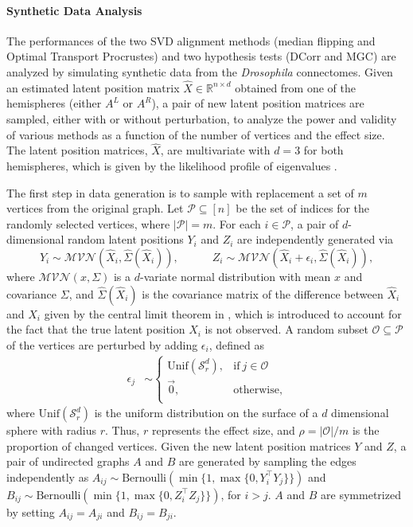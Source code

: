 \paragraph{Synthetic Data Analysis}
The performances of the two SVD alignment methods (median flipping and Optimal Transport Procrustes) and two hypothesis tests (DCorr and MGC) are analyzed by simulating synthetic data from the \textit{Drosophila} connectomes. Given an estimated latent position matrix $\hat X\in \mathbb{R}^{n\times d}$ obtained from one of the hemispheres (either $A^L$ or $A^R$), a pair of new latent position matrices are sampled, either with or without perturbation, to analyze the power and validity of various methods as a function of the number of vertices and the effect size. The latent position matrices, $\hat X$, are multivariate with $d=3$ for both hemispheres, which is given by the likelihood profile of eigenvalues \cite{zhu2006automatic}.

The first step in data generation is to sample with replacement a set of $m$ vertices from the original graph. Let $\mathcal{P}\subseteq [n]$ be the set of indices for the randomly selected vertices, where $|\mathcal{P}|=m$. For each $i\in\mathcal{P}$, a pair of $d$-dimensional random latent positions $Y_i$ and $Z_i$ are independently generated
via 
\[Y_i \sim \mathcal{MVN}(\hat X_i, \hat\Sigma(\hat X_i)), \quad\quad \quad Z_i \sim  \mathcal{MVN}(\hat X_i + \epsilon_i, \hat\Sigma(\hat X_i)),\]
where $\mathcal{MVN}(x, \Sigma)$  is a $d$-variate normal distribution with mean $x$ and covariance $\Sigma$, and $\hat\Sigma(\hat X_i)$ is the covariance matrix of the difference between $\hat{X}_i$ and  $X_i$ given by the central limit theorem in \cite{Athreya2015}, which is introduced to account for the fact that the true latent position $X_i$ is not observed. A random subset $\mathcal{O} \subseteq \mathcal{P}$ of the vertices are perturbed by adding $\epsilon_i$,  defined as 
\begin{align*}
\epsilon_j &\sim 
\begin{cases}
     \text{Unif}(\mathcal{S}^d_r), & \text{if}~j \in \mathcal{O}\\
    \vec 0, & \text{otherwise},\\
\end{cases}
\end{align*}
where $\text{Unif}(\mathcal{S}^d_r)$ is the uniform distribution on the surface of a $d$ dimensional sphere with radius $r$. Thus, $r$ represents the effect size, and $\rho = |\mathcal{O}| / m$ is the proportion of changed vertices. Given the new latent position matrices $Y$ and $Z$, a pair of undirected graphs $A$ and $B$ are generated by sampling the edges independently as $A_{ij}\sim\text{Bernoulli}(\min\{1, \max\{0, Y_i^\top Y_j\}\})$ and $B_{ij}\sim\text{Bernoulli}(\min\{1, \max\{0,Z_i^\top Z_j\}\})$, for $i>j$. $A$ and $B$ are symmetrized by setting $A_{ij} = A_{ji}$ and $B_{ij} = B_{ji}$.

